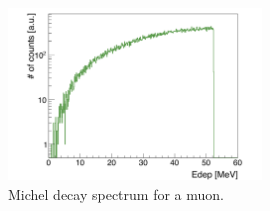 \documentclass[12pt]{article}
\begin{document}
\begin{figure}[ht!]
\centering
\includegraphics[width=0.6\textwidth]{img/michel}
\caption{Michel decay spectrum for a muon.}
\label{fig:michel}
\end{figure}
\end{document}
